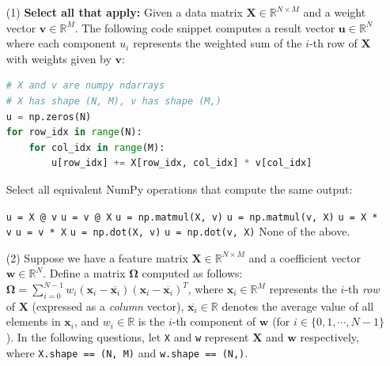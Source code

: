 \documentclass[11pt,addpoints,answers]{exam}
\newcommand{\xv}{\mathbf{x}}
\newcommand{\wv}{\mathbf{w}}
\newcommand{\vv}{\mathbf{v}}
\newcommand{\uv}{\mathbf{u}}
\newcommand{\Xv}{\mathbf{X}}
\newcommand{\Omegav}{\boldsymbol{\Omega}}
\newcommand{\sall}{\textbf{Select all that apply: }}
\begin{document}
	\begin{enumerate}[label=\alph*), itemsep=10pt]
		\item[(1)] \sall Given a data matrix $\Xv \in \mathbb{R}^{N \times M}$ and a weight vector $\vv \in \mathbb{R}^M$. The following code snippet computes a result vector $\uv \in \mathbb{R}^N$ where each component $u_i$ represents the weighted sum of the $i$-th row of $\Xv$ with weights given by $\vv$:
		\begin{lstlisting}[language=Python,escapechar=@]
# X and v are numpy ndarrays
# X has shape (N, M), v has shape (M,)
u = np.zeros(N)
for row_idx in range(N):
	for col_idx in range(M):
		u[row_idx] += X[row_idx, col_idx] * v[col_idx]
		\end{lstlisting}
		\vspace*{-2.5mm}
		Select all equivalent NumPy operations that compute the same output:
		
		{%
				\checkboxchar{$\Box$} \checkedchar{$\blacksquare$}
			\begin{checkboxes}
				\CorrectChoice \texttt{u = X @ v}
				\choice \texttt{u = v @ X}
				\CorrectChoice \texttt{u = np.matmul(X, v)}
				\choice \texttt{u = np.matmul(v, X)}
				\choice \texttt{u = X * v}
				\choice \texttt{u = v * X}
				\CorrectChoice \texttt{u = np.dot(X, v)}
				\choice \texttt{u = np.dot(v, X)}
				\choice None of the above.
			\end{checkboxes}
		}
		
		
		
		\item[(2)] Suppose we have a feature matrix $\Xv \in \mathbb{R}^{N \times M}$ and a coefficient vector $\wv \in \mathbb{R}^N$. Define a matrix $\Omegav$ computed as follows: $\Omegav = \sum_{i=0}^{N-1} w_i \left(\xv_i - \overline{\xv_i}\right) \left(\xv_i - \overline{\xv_i}\right)^T$, where $\xv_i \in \mathbb{R}^{M}$ represents the $i$-th \textit{row} of $\Xv$ (expressed as a \textit{column} vector), $\overline{\xv_i} \in \mathbb{R}$ denotes the average value of all elements in $\xv_i$, and $w_i \in \mathbb{R}$ is the $i$-th component of $\wv$ (for $i \in \{0, 1, \cdots, N-1\}$). In the following questions, let \texttt{X} and \texttt{w} represent $\Xv$ and $\wv$ respectively, where \texttt{X.shape == (N, M)} and \texttt{w.shape == (N,)}. %
		\begin{enumerate}[label=(\roman*), leftmargin=*]
			

\end{enumerate}
\end{enumerate}
\end{document}

